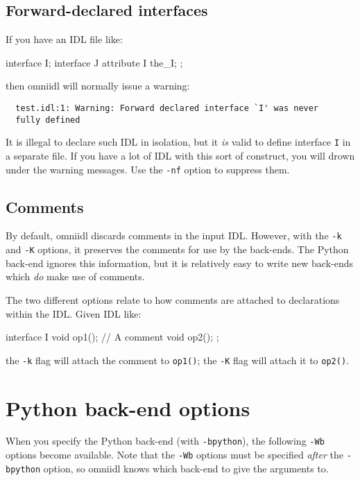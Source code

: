 \documentclass[11pt,oneside,a4paper]{book}
\newcommand{\intf}[1]{\texttt{#1}}
\newcommand{\op}[1]{\texttt{#1()}}
\newcommand{\cmdline}[1]{\texttt{#1}}
\begin{document}
\subsection{Forward-declared interfaces}

If you have an IDL file like:

\begin{idllisting}
interface I;
interface J {
  attribute I the_I;
};
\end{idllisting}

\noindent then omniidl will normally issue a warning:

{\small
\begin{verbatim}
  test.idl:1: Warning: Forward declared interface `I' was never
  fully defined
\end{verbatim}
}

\noindent It is illegal to declare such IDL in isolation, but it
\emph{is} valid to define interface \intf{I} in a separate file. If
you have a lot of IDL with this sort of construct, you will drown
under the warning messages. Use the \cmdline{-nf} option to suppress
them.


\subsection{Comments}

By default, omniidl discards comments in the input IDL. However, with
the \cmdline{-k} and \cmdline{-K} options, it preserves the comments
for use by the back-ends. The Python back-end ignores this
information, but it is relatively easy to write new back-ends which
\emph{do} make use of comments.

The two different options relate to how comments are attached to
declarations within the IDL. Given IDL like:

\begin{idllisting}
interface I {
  void op1();
  // A comment
  void op2();
};
\end{idllisting}

\noindent the \cmdline{-k} flag will attach the comment to \op{op1};
the \cmdline{-K} flag will attach it to \op{op2}.



\section{Python back-end options}
\label{sec:Wbglobal}

When you specify the Python back-end (with \cmdline{-bpython}), the
following \cmdline{-Wb} options become available. Note that the
\cmdline{-Wb} options must be specified \emph{after} the
\cmdline{-bpython} option, so omniidl knows which back-end to give the
arguments to.
\end{document}
